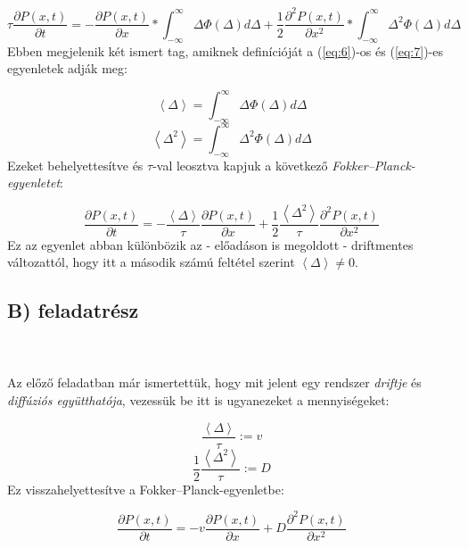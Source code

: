 \begin{equation}
    \tau \frac{\partial P \left( x, t \right)}{\partial t}
    =
    -
    \frac{\partial P \left( x, t \right)}{\partial x} * \int_{-\infty}^{\infty} \Delta \Phi \left( \Delta \right) d \Delta
    +
    \frac{1}{2} \frac{\partial^{2} P \left( x, t \right)}{\partial x^{2}} * \int_{-\infty}^{\infty} \Delta^{2} \Phi \left( \Delta \right) d \Delta
\end{equation}
Ebben megjelenik két ismert tag, amiknek definícióját a (\ref{eq:6})-os és (\ref{eq:7})-es egyenletek adják meg:

\begin{equation}
    \left< \Delta \right> = \int_{-\infty}^{\infty} \Delta \Phi \left( \Delta \right) d \Delta
\end{equation}
\begin{equation}
    \left< \Delta^{2} \right> = \int_{-\infty}^{\infty} \Delta^{2} \Phi \left( \Delta \right) d \Delta
\end{equation}
Ezeket behelyettesítve és $\tau$-val leosztva kapjuk a következő \emph{Fokker--Planck-egyenletet}:

\begin{equation}
    \boxed{\frac{\partial P \left( x, t \right)}{\partial t}
    =
    -
    \frac{\left< \Delta \right>}{\tau} \frac{\partial P \left( x, t \right)}{\partial x}
    +
    \frac{1}{2} \frac{\left< \Delta^{2} \right>}{\tau} \frac{\partial^{2} P \left( x, t \right)}{\partial x^{2}}}
\end{equation}
Ez az egyenlet abban különbözik az - előadáson is megoldott - driftmentes változattól, hogy itt a második számú feltétel szerint $\left< \Delta \right> \neq 0$.


\subsection*{B) feladatrész}
\\ \\
Az előző feladatban már ismertettük, hogy mit jelent egy rendszer \emph{driftje} és \emph{diffúziós együtthatója}, vezessük be itt is ugyanezeket a mennyiségeket:

\begin{equation}
    \frac{\left< \Delta \right>}{\tau} := v
\end{equation}
\begin{equation}
    \frac{1}{2} \frac{\left< \Delta^{2} \right>}{\tau} := D
\end{equation}
Ez visszahelyettesítve a Fokker--Planck-egyenletbe:

\begin{equation}
    \frac{\partial P \left( x, t \right)}{\partial t}
    =
    -
    v \frac{\partial P \left( x, t \right)}{\partial x}
    +
    D \frac{\partial^{2} P \left( x, t \right)}{\partial x^{2}}
\end{equation}